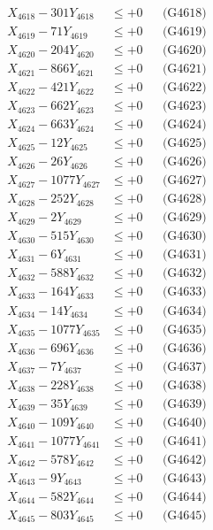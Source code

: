 \documentclass[a4paper,10pt]{article}
\begin{document}
{\begin{align}
X_{4618} - 301Y_{4618} &\leq +0 && \text{(G4618)} \\
X_{4619} - 71Y_{4619} &\leq +0 && \text{(G4619)} \\
X_{4620} - 204Y_{4620} &\leq +0 && \text{(G4620)} \\
\allowbreak
X_{4621} - 866Y_{4621} &\leq +0 && \text{(G4621)} \\
X_{4622} - 421Y_{4622} &\leq +0 && \text{(G4622)} \\
X_{4623} - 662Y_{4623} &\leq +0 && \text{(G4623)} \\
X_{4624} - 663Y_{4624} &\leq +0 && \text{(G4624)} \\
X_{4625} - 12Y_{4625} &\leq +0 && \text{(G4625)} \\
X_{4626} - 26Y_{4626} &\leq +0 && \text{(G4626)} \\
X_{4627} - 1077Y_{4627} &\leq +0 && \text{(G4627)} \\
X_{4628} - 252Y_{4628} &\leq +0 && \text{(G4628)} \\
X_{4629} - 2Y_{4629} &\leq +0 && \text{(G4629)} \\
X_{4630} - 515Y_{4630} &\leq +0 && \text{(G4630)} \\
\allowbreak
X_{4631} - 6Y_{4631} &\leq +0 && \text{(G4631)} \\
X_{4632} - 588Y_{4632} &\leq +0 && \text{(G4632)} \\
X_{4633} - 164Y_{4633} &\leq +0 && \text{(G4633)} \\
X_{4634} - 14Y_{4634} &\leq +0 && \text{(G4634)} \\
X_{4635} - 1077Y_{4635} &\leq +0 && \text{(G4635)} \\
X_{4636} - 696Y_{4636} &\leq +0 && \text{(G4636)} \\
X_{4637} - 7Y_{4637} &\leq +0 && \text{(G4637)} \\
X_{4638} - 228Y_{4638} &\leq +0 && \text{(G4638)} \\
X_{4639} - 35Y_{4639} &\leq +0 && \text{(G4639)} \\
X_{4640} - 109Y_{4640} &\leq +0 && \text{(G4640)} \\
\allowbreak
X_{4641} - 1077Y_{4641} &\leq +0 && \text{(G4641)} \\
X_{4642} - 578Y_{4642} &\leq +0 && \text{(G4642)} \\
X_{4643} - 9Y_{4643} &\leq +0 && \text{(G4643)} \\
X_{4644} - 582Y_{4644} &\leq +0 && \text{(G4644)} \\
X_{4645} - 803Y_{4645} &\leq +0 && \text{(G4645)} \\

\end{align}}
\end{document}
